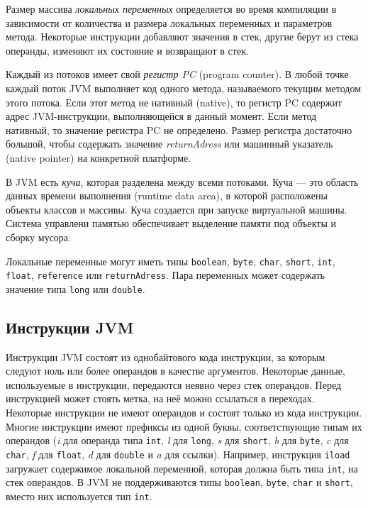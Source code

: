 Размер массива \emph{локальных переменных} определяется во время компиляции в зависимости от количества и размера локальных 
переменных и параметров метода. Некоторые инструкции добавляют значения в стек, другие берут из стека операнды, изменяют 
их состояние и возвращают в стек. 

Каждый из потоков имеет свой \emph{регистр PC} (program counter). В любой точке каждый поток JVM выполняет код одного метода, 
называемого текущим методом этого потока. Если этот метод не нативный (native), то регистр PC содержит адрес JVM-инструкции, 
выполняющейся в данный момент. Если метод нативный, то значение регистра PC не определено. Размер регистра достаточно большой, 
чтобы содержать значение \emph{returnAdress} или машинный указатель (native pointer) на конкретной платформе.

В JVM есть \emph{куча}, которая разделена между всеми потоками. Куча --- это область данных времени выполнения 
(runtime data area), в которой расположены объекты классов и массивы. Куча создается при запуске виртуальной машины. 
Система управлени памятью обеспечивает выделение памяти под объекты и сборку мусора.

Локальные переменные могут иметь типы \texttt{boolean}, \texttt{byte}, \texttt{char}, \texttt{short}, \texttt{int}, \texttt{float}, 
\texttt{reference} или \texttt{returnAdress}. Пара переменных может содержать значение типа \texttt{long} или \texttt{double}.

\subsection{Инструкции JVM}

Инструкции JVM состоят из однобайтового кода инструкции, за которым следуют ноль или более операндов в качестве аргументов. 
Некоторые данные, используемые в инструкции, передаются неявно через стек операндов. Перед инструкцией может стоять метка, на неё 
можно ссылаться в переходах. Некоторые инструкции не имеют операндов и состоят только из кода инструкции. Многие инструкции имеют
префиксы из одной буквы, соответствующие типам их операндов ({\it i} для операнда типа \texttt{int}, {\it l} для \texttt{long}, 
{\it s} для \texttt{short}, {\it b} для \texttt{byte}, {\it c} для \texttt{char}, {\it f} для \texttt{float}, {\it d} для \texttt{double} 
и {\it a} для ссылки). Например, инструкция \texttt{iload} загружает содержимое локальной переменной, которая должна быть типа 
\texttt{int}, на стек операндов. В JVM не поддерживаются типы \texttt{boolean}, \texttt{byte}, \texttt{char} и \texttt{short}, 
вместо них используется тип \texttt{int}. 

